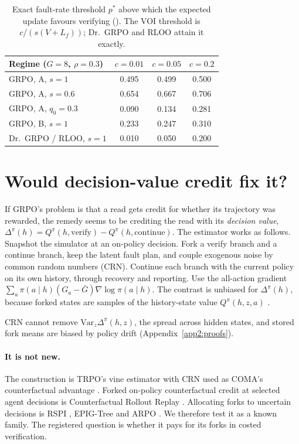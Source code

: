 \documentclass[11pt]{article}
\begin{document}
\begin{table}[t]
\centering\small
\begin{tabular}{lccc}
\toprule
Regime ($G{=}8$, $\rho{=}0.3$) & $c{=}0.01$ & $c{=}0.05$ & $c{=}0.2$\\
\midrule
GRPO, A, $s{=}1$ & 0.495 & 0.499 & 0.500\\
GRPO, A, $s{=}0.6$ & 0.654 & 0.667 & 0.706\\
GRPO, A, $q_0{=}0.3$ & 0.090 & 0.134 & 0.281\\
GRPO, B, $s{=}1$ & 0.233 & 0.247 & 0.310\\
Dr.~GRPO / RLOO, $s{=}1$ & 0.010 & 0.050 & 0.200\\
\bottomrule
\end{tabular}
\caption{Exact fault-rate threshold $p^*$ above which the expected update favours verifying
(). The VOI threshold is $c/(s(V{+}L_f))$; Dr.~GRPO and RLOO attain it
exactly.}
\label{tab:thr}
\end{table}

\section{Would decision-value credit fix it?}\label{sec:cdvo}

If GRPO's problem is that a read gets credit for whether its trajectory was rewarded, the remedy seems to be
crediting the read with its \emph{decision value}, $\Delta^\pi(h)=Q^\pi(h,\text{verify})-Q^\pi(h,\text{continue})$.
The estimator works as follows. Snapshot the simulator at an on-policy decision. Fork a verify branch and a continue
branch, keep the latent fault plan, and couple exogenous noise by common random numbers (CRN). Continue each branch
with the current policy on its own history, through recovery and reporting. Use the all-action gradient
$\sum_a\pi(a\mid h)(G_a-\bar G)\nabla\log\pi(a\mid h)$. The contrast is unbiased for $\Delta^\pi(h)$, because forked
states are samples of the history-state value $Q^\pi(h,z,a)$ \citep{baisero2022unbiased}.

CRN cannot remove $\mathrm{Var}_z\Delta^\pi(h,z)$, the spread across hidden states, and stored fork means are biased
by policy drift (Appendix~\ref{app2:proofs}).

\paragraph{It is not new.} The construction is TRPO's vine estimator with CRN \citep{schulman2015trpo} used as COMA's
counterfactual advantage \citep{foerster2017coma}. Forked on-policy counterfactual credit at selected agent
decisions is Counterfactual Rollout Replay \citep{li2026crr}. Allocating forks to uncertain decisions is RSPI
\citep{dimitrakakis2008rspi}, EPIG-Tree \citep{khomich2026epig} and ARPO \citep{dong2026arpo}. We therefore test it
as a known family. The registered question is whether it pays for its forks in costed verification.
\end{document}
